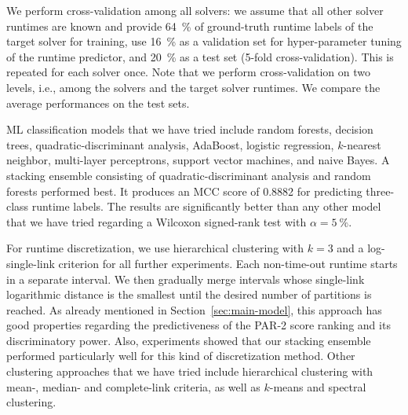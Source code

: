 \documentclass[runningheads]{llncs}
\begin{document}

We perform cross-validation among all solvers: we assume that all other solver runtimes are known and provide \SI{64}{\%} of ground-truth runtime labels of the target solver for training, use \SI{16}{\%} as a validation set for hyper-parameter tuning of the runtime predictor, and \SI{20}{\%} as a test set (5-fold cross-validation).
This is repeated for each solver once.
Note that we perform cross-validation on two levels, i.e., among the solvers and the target solver runtimes.
We compare the average performances on the test sets.

ML classification models that we have tried include random forests, decision trees, quadratic-discriminant analysis, AdaBoost, logistic regression, $k$-nearest neighbor, multi-layer perceptrons, support vector machines, and naive Bayes.
A stacking ensemble consisting of quadratic-discriminant analysis and random forests performed best.
It produces an MCC score of \SI{0.8882}{} for predicting three-class runtime labels.
The results are significantly better than any other model that we have tried regarding a Wilcoxon signed-rank test with $\alpha = \SI{5}{\%}$.


For runtime discretization, we use hierarchical clustering with $k = 3$ and a log-single-link criterion for all further experiments.
Each non-time-out runtime starts in a separate interval.
We then gradually merge intervals whose single-link logarithmic distance is the smallest until the desired number of partitions is reached.
As already mentioned in Section~\ref{sec:main-model}, this approach has good properties regarding the predictiveness of the PAR-2 score ranking and its discriminatory power.
Also, experiments showed that our stacking ensemble performed particularly well for this kind of discretization method.
Other clustering approaches that we have tried include hierarchical clustering with mean-, median- and complete-link criteria, as well as $k$-means and spectral clustering.
\end{document}
